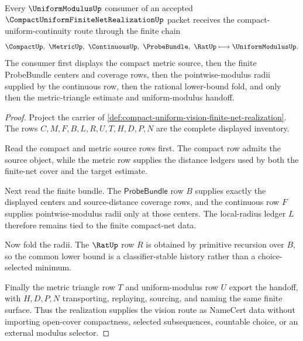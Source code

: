 \begin{theorem}
\label{thm:compact-uniform-vision-modulus-handoff}
Every $\UniformModulusUp$ consumer of an accepted $\CompactUniformFiniteNetRealizationUp$ packet receives the compact-uniform-continuity route through the finite chain
$$
\CompactUp,\ \MetricUp,\ \ContinuousUp,\ \ProbeBundle,\ \RatUp
\longmapsto
\UniformModulusUp .
$$
The consumer first displays the compact metric source, then the finite ProbeBundle centers and coverage rows, then the pointwise-modulus radii supplied by the continuous row, then the rational lower-bound fold, and only then the metric-triangle estimate and uniform-modulus handoff.
\end{theorem}
\begin{proof}
Project the carrier of \autoref{def:compact-uniform-vision-finite-net-realization}. The rows $C,M,F,B,L,R,U,T,H,D,P,N$ are the complete displayed inventory.

Read the compact and metric source rows first. The compact row admits the source object, while the metric row supplies the distance ledgers used by both the finite-net cover and the target estimate.

Next read the finite bundle. The $\mathsf{ProbeBundle}$ row $B$ supplies exactly the displayed centers and source-distance coverage rows, and the continuous row $F$ supplies pointwise-modulus radii only at those centers. The local-radius ledger $L$ therefore remains tied to the finite compact-net data.

Now fold the radii. The $\RatUp$ row $R$ is obtained by primitive recursion over $B$, so the common lower bound is a classifier-stable history rather than a choice-selected minimum.

Finally the metric triangle row $T$ and uniform-modulus row $U$ export the handoff, with $H,D,P,N$ transporting, replaying, sourcing, and naming the same finite surface. Thus the realization supplies the vision route as NameCert data without importing open-cover compactness, selected subsequences, countable choice, or an external modulus selector.
\end{proof}

